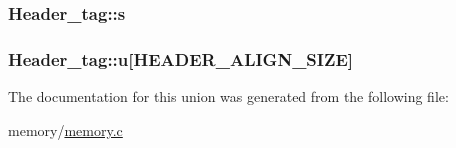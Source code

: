 \subsubsection[{s}]{ Header\+\_\+tag\+::s}\label{union_header__tag_a9431ea46df35bb4feca322cb96246bab}
\hypertarget{union_header__tag_a5fbc38dfa9adcb54937811882ea1e8b3}{}
\subsubsection[{u}]{ Header\+\_\+tag\+::u\mbox{[}{\bf H\+E\+A\+D\+E\+R\+\_\+\+A\+L\+I\+G\+N\+\_\+\+S\+I\+Z\+E}\mbox{]}}\label{union_header__tag_a5fbc38dfa9adcb54937811882ea1e8b3}


The documentation for this union was generated from the following file\+:\begin{DoxyCompactItemize}
\item 
memory/\hyperlink{memory_8c}{memory.\+c}\end{DoxyCompactItemize}
